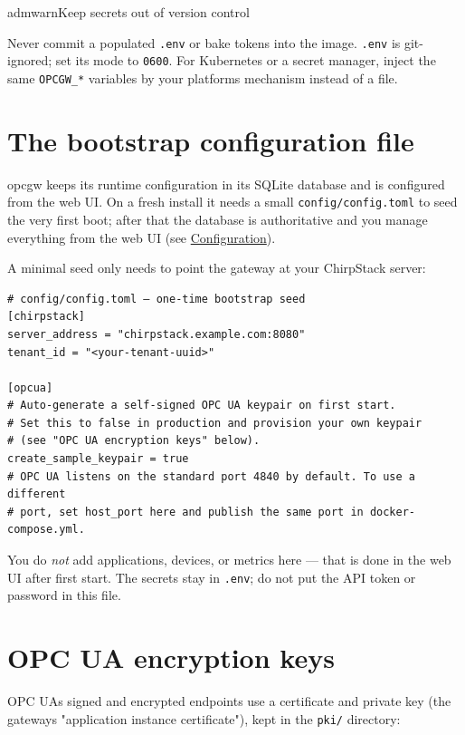 \begin{admonition}{admwarn}{Keep secrets out of version control}

Never commit a populated \texttt{.env} or bake tokens into the image. \texttt{.env} is git-ignored; set its mode to \texttt{0600}. For Kubernetes or a secret manager, inject the same \texttt{OPCGW\_*} variables by your platform\textquotesingle s mechanism instead of a file.

\end{admonition}

\section{The bootstrap configuration file}\label{sec-install-bootstrap-config}

opcgw keeps its runtime configuration in its SQLite database and is configured from the web UI. On a fresh install it needs a small \texttt{config/config.toml} to seed the very first boot; after that the database is authoritative and you manage everything from the web UI (see \hyperref[ch-configuration]{Configuration}).

A minimal seed only needs to point the gateway at your ChirpStack server:

\begin{lstlisting}
# config/config.toml — one-time bootstrap seed
[chirpstack]
server_address = "chirpstack.example.com:8080"
tenant_id = "<your-tenant-uuid>"

[opcua]
# Auto-generate a self-signed OPC UA keypair on first start.
# Set this to false in production and provision your own keypair
# (see "OPC UA encryption keys" below).
create_sample_keypair = true
# OPC UA listens on the standard port 4840 by default. To use a different
# port, set host_port here and publish the same port in docker-compose.yml.
\end{lstlisting}

You do \emph{not} add applications, devices, or metrics here --- that is done in the web UI after first start. The secrets stay in \texttt{.env}; do not put the API token or password in this file.

\section{OPC UA encryption keys}\label{sec-install-keys}

OPC UA\textquotesingle s signed and encrypted endpoints use a certificate and private key (the gateway\textquotesingle s "application instance certificate"), kept in the \texttt{pki/} directory:

